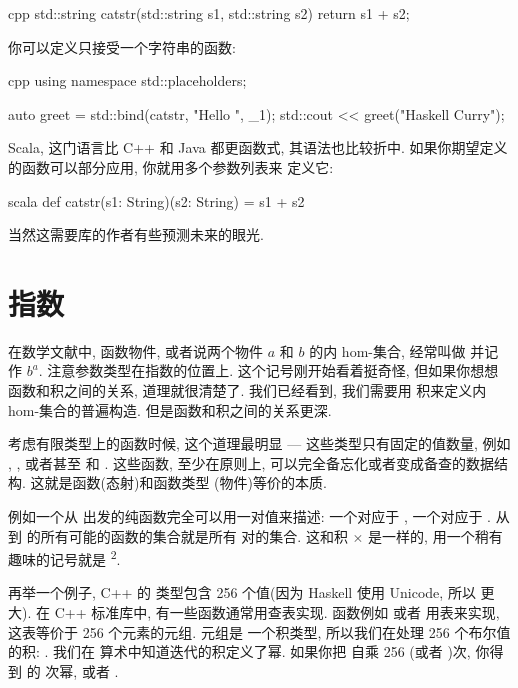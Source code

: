 \begin{snip}{cpp}
std::string catstr(std::string s1, std::string s2) {
    return s1 + s2;
}
\end{snip}
你可以定义只接受一个字符串的函数:

\begin{snip}{cpp}
using namespace std::placeholders;

auto greet = std::bind(catstr, "Hello ", _1);
std::cout << greet("Haskell Curry");
\end{snip}
Scala, 这门语言比 C++ 和 Java 都更函数式, 其语法也比较折中. 如果你期望定义的函数可以部分应用, 你就用多个参数列表来
定义它:

\begin{snip}{scala}
def catstr(s1: String)(s2: String) = s1 + s2
\end{snip}
当然这需要库的作者有些预测未来的眼光.

\section{指数}

在数学文献中, 函数物件, 或者说两个物件 $a$ 和 $b$ 的内 hom-集合, 经常叫做  并记作 $b^{a}$.
注意参数类型在指数的位置上. 这个记号刚开始看着挺奇怪, 但如果你想想函数和积之间的关系, 道理就很清楚了. 我们已经看到, 我们需要用
积来定义内 hom-集合的普遍构造. 但是函数和积之间的关系更深.

考虑有限类型上的函数时候, 这个道理最明显 --- 这些类型只有固定的值数量, 例如 , , 或者甚至
 和 . 这些函数, 至少在原则上, 可以完全备忘化或者变成备查的数据结构. 这就是函数(态射)和函数类型
(物件)等价的本质.

例如一个从  出发的纯函数完全可以用一对值来描述: 一个对应于 , 一个对应于 .
从  到  的所有可能的函数的集合就是所有  对的集合. 这和积  $\times$ 
是一样的, 用一个稍有趣味的记号就是 \textsuperscript{2}.

再举一个例子, C++ 的  类型包含 256 个值(因为 Haskell 使用 Unicode, 所以  更大). 在 C++ 标准库中,
有一些函数通常用查表实现. 函数例如  或者  用表来实现, 这表等价于 256 个元素的元组. 元组是
一个积类型, 所以我们在处理 256 个布尔值的积: . 我们在
算术中知道迭代的积定义了幂. 如果你把  自乘 256 (或者 )次, 你得到  的  次幂,
或者 \textsuperscript{}.

